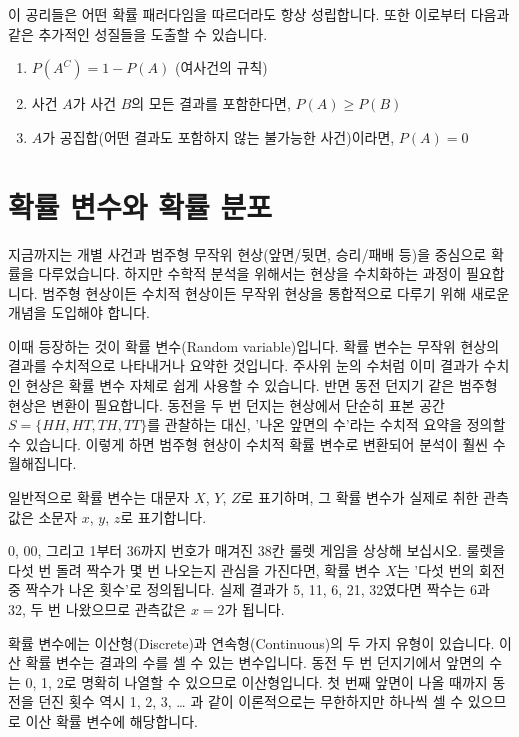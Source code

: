 \documentclass[
]{scrbook}
\providecommand{\tightlist}{%
  \setlength{\itemsep}{0pt}\setlength{\parskip}{0pt}}
\begin{document}
이 공리들은 어떤 확률 패러다임을 따르더라도 항상 성립합니다. 또한
이로부터 다음과 같은 추가적인 성질들을 도출할 수 있습니다.

\begin{enumerate}
\def\labelenumi{\arabic{enumi}.}
\tightlist
\item
  \(P(A^C) = 1 - P(A)\) (여사건의 규칙)
\item
  사건 \(A\)가 사건 \(B\)의 모든 결과를 포함한다면, \(P(A) \ge P(B)\)
\item
  \(A\)가 공집합(어떤 결과도 포함하지 않는 불가능한 사건)이라면,
  \(P(A) = 0\)
\end{enumerate}

\section{확률 변수와 확률
분포}\label{uxd655uxb960-uxbcc0uxc218uxc640-uxd655uxb960-uxbd84uxd3ec}

지금까지는 개별 사건과 범주형 무작위 현상(앞면/뒷면, 승리/패배 등)을
중심으로 확률을 다루었습니다. 하지만 수학적 분석을 위해서는 현상을
수치화하는 과정이 필요합니다. 범주형 현상이든 수치적 현상이든 무작위
현상을 통합적으로 다루기 위해 새로운 개념을 도입해야 합니다.

이때 등장하는 것이 확률 변수(Random variable)입니다. 확률 변수는 무작위
현상의 결과를 수치적으로 나타내거나 요약한 것입니다. 주사위 눈의 수처럼
이미 결과가 수치인 현상은 확률 변수 자체로 쉽게 사용할 수 있습니다. 반면
동전 던지기 같은 범주형 현상은 변환이 필요합니다. 동전을 두 번 던지는
현상에서 단순히 표본 공간 \(S=\{HH, HT, TH, TT\}\)를 관찰하는 대신,
'나온 앞면의 수'라는 수치적 요약을 정의할 수 있습니다. 이렇게 하면
범주형 현상이 수치적 확률 변수로 변환되어 분석이 훨씬 수월해집니다.

일반적으로 확률 변수는 대문자 \(X\), \(Y\), \(Z\)로 표기하며, 그 확률
변수가 실제로 취한 관측값은 소문자 \(x\), \(y\), \(z\)로 표기합니다.

0, 00, 그리고 1부터 36까지 번호가 매겨진 38칸 룰렛 게임을 상상해
보십시오. 룰렛을 다섯 번 돌려 짝수가 몇 번 나오는지 관심을 가진다면,
확률 변수 \(X\)는 '다섯 번의 회전 중 짝수가 나온 횟수'로 정의됩니다.
실제 결과가 5, 11, 6, 21, 32였다면 짝수는 6과 32, 두 번 나왔으므로
관측값은 \(x=2\)가 됩니다.

확률 변수에는 이산형(Discrete)과 연속형(Continuous)의 두 가지 유형이
있습니다. 이산 확률 변수는 결과의 수를 셀 수 있는 변수입니다. 동전 두 번
던지기에서 앞면의 수는 0, 1, 2로 명확히 나열할 수 있으므로 이산형입니다.
첫 번째 앞면이 나올 때까지 동전을 던진 횟수 역시 1, 2, 3, \ldots{} 과
같이 이론적으로는 무한하지만 하나씩 셀 수 있으므로 이산 확률 변수에
해당합니다.
\end{document}
